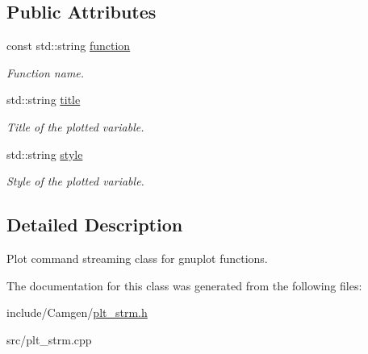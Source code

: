 \subsection*{Public Attributes}
\begin{DoxyCompactItemize}
\item 
\hypertarget{a00235_a3e82c7a76b1bdd820222abd5996c3f13}{}const std\+::string \hyperlink{a00235_a3e82c7a76b1bdd820222abd5996c3f13}{function}\label{a00235_a3e82c7a76b1bdd820222abd5996c3f13}

\begin{DoxyCompactList}\small\item\em Function name. \end{DoxyCompactList}\item 
\hypertarget{a00235_ae92cbfd7ee917d5737abc3f5fae2384b}{}std\+::string \hyperlink{a00235_ae92cbfd7ee917d5737abc3f5fae2384b}{title}\label{a00235_ae92cbfd7ee917d5737abc3f5fae2384b}

\begin{DoxyCompactList}\small\item\em Title of the plotted variable. \end{DoxyCompactList}\item 
\hypertarget{a00235_af4af167b5b94933151562b3bacef443a}{}std\+::string \hyperlink{a00235_af4af167b5b94933151562b3bacef443a}{style}\label{a00235_af4af167b5b94933151562b3bacef443a}

\begin{DoxyCompactList}\small\item\em Style of the plotted variable. \end{DoxyCompactList}\end{DoxyCompactItemize}


\subsection{Detailed Description}
Plot command streaming class for gnuplot functions. 

The documentation for this class was generated from the following files\+:\begin{DoxyCompactItemize}
\item 
include/\+Camgen/\hyperlink{a00724}{plt\+\_\+strm.\+h}\item 
src/plt\+\_\+strm.\+cpp\end{DoxyCompactItemize}
